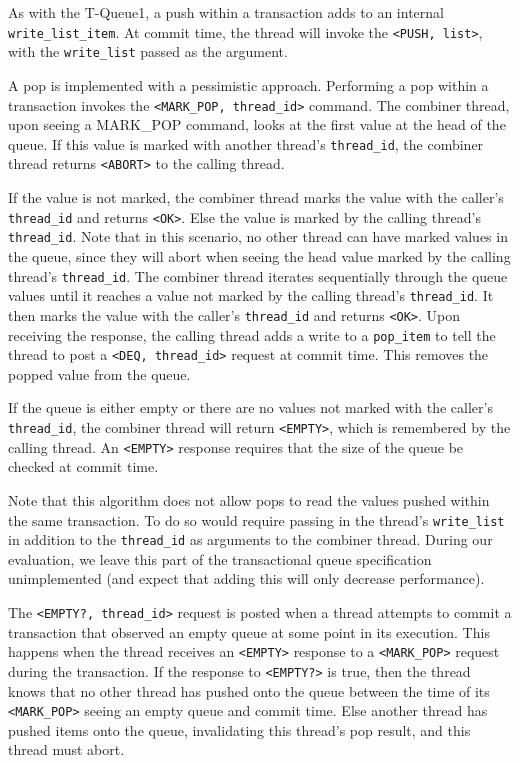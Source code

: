 As with the T-Queue1, a push within a transaction adds to an internal \texttt{write\_list\_item}. At commit time, the thread will invoke the \texttt{<PUSH, list>}, with the \texttt{write\_list} passed as the argument.

A pop is implemented with a pessimistic approach. Performing a pop within a transaction invokes the \texttt{<MARK\_POP, thread\_id>} command. The combiner thread, upon seeing a MARK\_POP command, looks at the first value at the head of the queue. If this value is marked with another thread's \texttt{thread\_id}, the combiner thread returns \texttt{<ABORT>} to the calling thread.

If the value is not marked, the combiner thread marks the value with the caller's \texttt{thread\_id} and returns \texttt{<OK>}. Else the value is marked by the calling thread's \texttt{thread\_id}. Note that in this scenario, no other thread can have marked values in the queue, since they will abort when seeing the head value marked by the calling thread's \texttt{thread\_id}. The combiner thread iterates sequentially through the queue values until it reaches a value not marked by the calling thread's \texttt{thread\_id}. It then marks the value with the caller's \texttt{thread\_id} and returns \texttt{<OK>}. Upon receiving the response, the calling thread adds a write to a \texttt{pop\_item} to tell the thread to post a \texttt{<DEQ, thread\_id>} request at commit time. This removes the popped value from the queue.

If the queue is either empty or there are no values not marked with the caller's \texttt{thread\_id}, the combiner thread will return \texttt{<EMPTY>}, which is remembered by the calling thread. An \texttt{<EMPTY>} response requires that the size of the queue be checked at commit time.

Note that this algorithm does not allow pops to read the values pushed within the same transaction. To do so would require passing in the thread's \texttt{write\_list} in addition to the \texttt{thread\_id} as arguments to the combiner thread. During our evaluation, we leave this part of the transactional queue specification unimplemented (and expect that adding this will only decrease performance).

The \texttt{<EMPTY?, thread\_id>} request is posted when a thread attempts to commit a transaction that observed an empty queue at some point in its execution. This happens when the thread receives an \texttt{<EMPTY>} response to a \texttt{<MARK\_POP>} request during the transaction. If the response to \texttt{<EMPTY?>} is true, then the thread knows that no other thread has pushed onto the queue between the time of its \texttt{<MARK\_POP>} seeing an empty queue and commit time. Else another thread has pushed items onto the queue, invalidating this thread's pop result, and this thread must abort.

